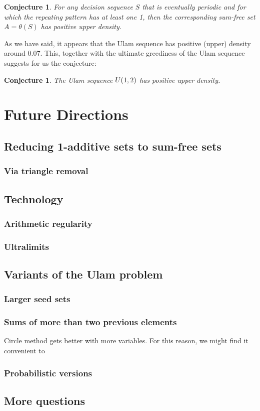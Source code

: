 \documentclass{report}
\newtheorem{conjecture}[theorem]{Conjecture}
\theoremstyle{remark}
\numberwithin{equation}{section}
\begin{document}
\begin{conjecture}
  For any decision sequence $S$ that is eventually periodic and for
  which the repeating pattern has at least one 1, then the
  corresponding sum-free set $A = \theta(S)$ has positive upper
  density.
\end{conjecture}

As we have said, it appears that the Ulam sequence has positive
(upper) density around $0.07$.  This, together with the ultimate
greediness of the Ulam sequence suggests for us the conjecture:

\begin{conjecture}
  The Ulam sequence $U(1,2)$ has positive upper density.
\end{conjecture}

{\color{red}

\chapter{Future Directions}

\section{Reducing 1-additive sets to sum-free sets}

\subsection{Via triangle removal}

\section{Technology}

\subsection{Arithmetic regularity}

\subsection{Ultralimits}

\section{Variants of the Ulam problem}
\subsection{Larger seed sets}
\subsection{Sums of more than two previous elements}

Circle method gets better with more variables.  For this reason, we
might find it convenient to 

\subsection{Probabilistic versions}

\section{More questions}

}


{}

\end{document}
